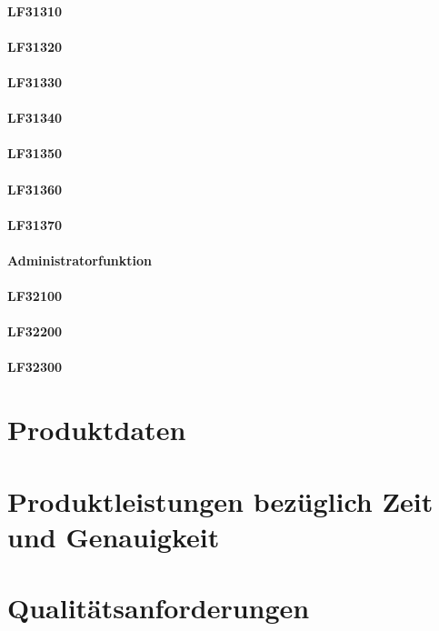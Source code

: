 \documentclass[a4paper,11pt]{article}             %
\begin{document}
			\paragraph{LF31310}
			\paragraph{LF31320}
			\paragraph{LF31330}
			\paragraph{LF31340}
			\paragraph{LF31350}
			\paragraph{LF31360}
			\paragraph{LF31370}
		
		\paragraph{Administratorfunktion}
			\paragraph{LF32100}
			\paragraph{LF32200}
			\paragraph{LF32300}



\section{Produktdaten}
\section{Produktleistungen bezüglich Zeit und Genauigkeit}
\section{Qualitätsanforderungen}
\end{document}
